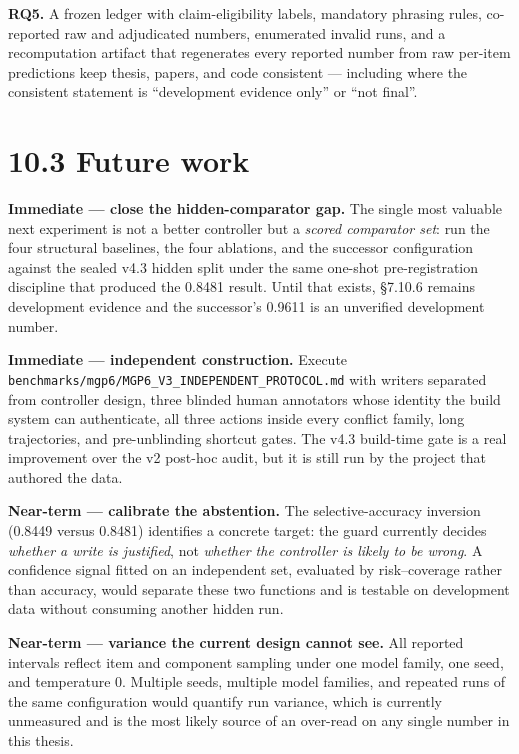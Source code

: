 \textbf{RQ5.} A frozen ledger with claim-eligibility labels, mandatory
phrasing rules, co-reported raw and adjudicated numbers, enumerated
invalid runs, and a recomputation artifact that regenerates every
reported number from raw per-item predictions keep thesis, papers, and
code consistent --- including where the consistent statement is
``development evidence only'' or ``not final''.

\section{10.3 Future work}\label{future-work}

\textbf{Immediate --- close the hidden-comparator gap.} The single most
valuable next experiment is not a better controller but a \emph{scored
comparator set}: run the four structural baselines, the four ablations,
and the successor configuration against the sealed v4.3 hidden split
under the same one-shot pre-registration discipline that produced the
0.8481 result. Until that exists, §7.10.6 remains development evidence
and the successor's 0.9611 is an unverified development number.

\textbf{Immediate --- independent construction.} Execute
\texttt{benchmarks/mgp6/MGP6\_V3\_INDEPENDENT\_PROTOCOL.md} with writers
separated from controller design, three blinded human annotators whose
identity the build system can authenticate, all three actions inside
every conflict family, long trajectories, and pre-unblinding shortcut
gates. The v4.3 build-time gate is a real improvement over the v2
post-hoc audit, but it is still run by the project that authored the
data.

\textbf{Near-term --- calibrate the abstention.} The selective-accuracy
inversion (0.8449 versus 0.8481) identifies a concrete target: the guard
currently decides \emph{whether a write is justified}, not \emph{whether
the controller is likely to be wrong}. A confidence signal fitted on an
independent set, evaluated by risk--coverage rather than accuracy, would
separate these two functions and is testable on development data without
consuming another hidden run.

\textbf{Near-term --- variance the current design cannot see.} All
reported intervals reflect item and component sampling under one model
family, one seed, and temperature 0. Multiple seeds, multiple model
families, and repeated runs of the same configuration would quantify run
variance, which is currently unmeasured and is the most likely source of
an over-read on any single number in this thesis.

